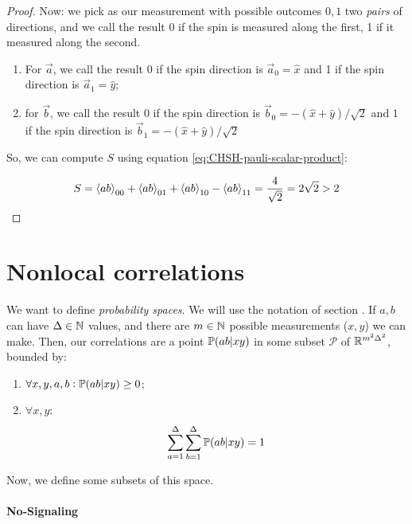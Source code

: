 \documentclass[main.tex]{subfiles}
\begin{document}
\begin{proof}
Now: we pick as our measurement with possible outcomes \(0, 1\) two \emph{pairs} of directions, and we call the result 0 if the spin is measured along the first, 1 if it measured along the second.

\begin{enumerate}
    \item For \(\vec{a} \), we call the result \(0\) if the spin direction is \(\vec{a}_0=  \hat{x} \) and 1 if the spin direction is \(\vec{a}_1=\hat{y} \);
    \item for \(\vec{b} \), we call the result \(0\) if the spin direction is \(\vec{b}_0=-(\hat{x} +\hat{y} )/\sqrt{2} \) and \(1\) if the spin direction is \(\vec{b}_1= -(\hat{x}+\hat{y})/\sqrt{2} \)
\end{enumerate}

So, we can compute \(S\) using equation \eqref{eq:CHSH-pauli-scalar-product}:

\begin{equation}
    S = \expval{ab}_{00} +
     \expval{ab}_{01} +
     \expval{ab}_{10} -
     \expval{ab}_{11}
     = \frac{4}{\sqrt{2}} = 2 \sqrt{2} > 2
\end{equation}
\end{proof}

\section{Nonlocal correlations}

We want to define \emph{probability spaces}. We will use the notation of section . If \(a,b\) can have \(\Delta \in \N\) values, and there are \(m \in \N \) possible measurements (\(x, y\)) we can make. Then, our correlations are a point \(\P(ab | xy)\) in some subset \(\mathcal P\) of \(\R ^{m^2 \Delta^2}\), bounded by:

\begin{enumerate}
    \item \(\forall x, y, a, b: \P (ab|xy)\geq 0\);
    \item \(\forall x, y\):
    \begin{equation}
        \sum_{a=1}^{\Delta} \sum_{b=1}^{\Delta} \P(ab|xy) = 1
    \end{equation}
\end{enumerate}

Now, we define some subsets of this space.

\paragraph{No-Signaling}
\end{document}
